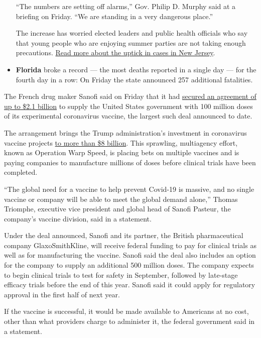 \begin{itemize}
  ``The numbers are setting off alarms,'' Gov. Philip D. Murphy said at
  a briefing on Friday. ``We are standing in a very dangerous place.''

  The increase has worried elected leaders and public health officials
  who say that young people who are enjoying summer parties are not
  taking enough precautions.
  \href{https://www.nytimes.com/2020/07/30/nyregion/coronavirus-cases-nj.html}{Read
  more about the uptick in cases in New Jersey}.
\item
  \textbf{Florida} broke a record --- the most deaths reported in a
  single day --- for the fourth day in a row: On Friday the state
  announced 257 additional fatalities.
\end{itemize}

The French drug maker Sanofi said on Friday that it had
\href{https://www.nytimes.com/2020/07/31/health/covid-19-vaccine-sanofi-gsk.html}{secured
an agreement of up to \$2.1 billion} to supply the United States
government with 100 million doses of its experimental coronavirus
vaccine, the largest such deal announced to date.

The arrangement brings the Trump administration's investment in
coronavirus vaccine projects
\href{https://medicalcountermeasures.gov/app/barda/coronavirus/COVID19.aspx?filter=vaccine}{to
more than \$8 billion}. This sprawling, multiagency effort, known as
Operation Warp Speed, is placing bets on multiple vaccines and is paying
companies to manufacture millions of doses before clinical trials have
been completed.

``The global need for a vaccine to help prevent Covid-19 is massive, and
no single vaccine or company will be able to meet the global demand
alone,'' Thomas Triomphe, executive vice president and global head of
Sanofi Pasteur, the company's vaccine division, said in a statement.

Under the deal announced, Sanofi and its partner, the British
pharmaceutical company GlaxoSmithKline, will receive federal funding to
pay for clinical trials as well as for manufacturing the vaccine. Sanofi
said the deal also includes an option for the company to supply an
additional 500 million doses. The company expects to begin clinical
trials to test for safety in September, followed by late-stage efficacy
trials before the end of this year. Sanofi said it could apply for
regulatory approval in the first half of next year.

If the vaccine is successful, it would be made available to Americans at
no cost, other than what providers charge to administer it, the federal
government said in a statement.

